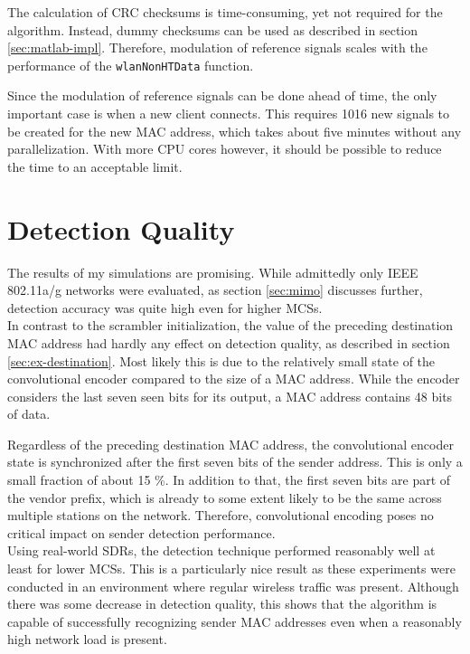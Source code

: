 The calculation of \gls{CRC} checksums is time-consuming, yet not required for the algorithm. Instead, dummy checksums can be used as described in section \ref{sec:matlab-impl}. Therefore, modulation of reference signals scales with the performance of the \texttt{wlanNonHTData} function.

Since the modulation of reference signals can be done ahead of time, the only important case is when a new client connects. This requires 1016 new signals to be created for the new \gls{MAC} address, which takes about five minutes without any parallelization. With more CPU cores however, it should be possible to reduce the time to an acceptable limit.



\section{Detection Quality}\label{sec:detection-quality}

The results of my simulations are promising. While admittedly only IEEE 802.11a/g networks were evaluated, as section \ref{sec:mimo} discusses further, detection accuracy was quite high even for higher \glspl{MCS}.\\

In contrast to the scrambler initialization, the value of the preceding destination \gls{MAC} address had hardly any effect on detection quality, as described in section \ref{sec:ex-destination}. Most likely this is due to the relatively small state of the convolutional encoder compared to the size of a \gls{MAC} address. While the encoder considers the last seven seen bits for its output, a \gls{MAC} address contains 48 bits of data.

Regardless of the preceding destination \gls{MAC} address, the convolutional encoder state is synchronized after the first seven bits of the sender address. This is only a small fraction of about 15 \%. In addition to that, the first seven bits are part of the vendor prefix, which is already to some extent likely to be the same across multiple stations on the network. Therefore, convolutional encoding poses no critical impact on sender detection performance.\\

Using real-world \glspl{SDR}, the detection technique performed reasonably well at least for lower \glspl{MCS}. This is a particularly nice result as these experiments were conducted in an environment where regular wireless traffic was present. Although there was some decrease in detection quality, this shows that the algorithm is capable of successfully recognizing sender \gls{MAC} addresses even when a reasonably high network load is present.


